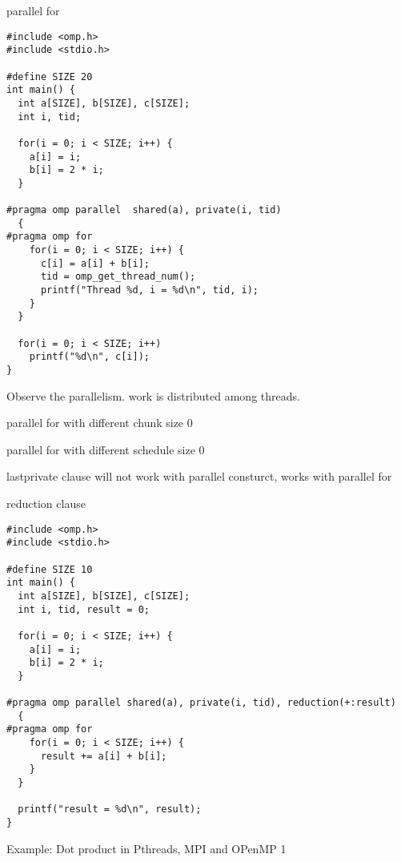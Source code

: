 \documentclass[14pt]{beamer}
\begin{document}
\begin{frame}[fragile]{parallel for}
\begin{Verbatim}
#include <omp.h>
#include <stdio.h>

#define SIZE 20
int main() {        
  int a[SIZE], b[SIZE], c[SIZE];
  int i, tid;

  for(i = 0; i < SIZE; i++) {
    a[i] = i;
    b[i] = 2 * i;
  }

#pragma omp parallel  shared(a), private(i, tid)
  {
#pragma omp for
    for(i = 0; i < SIZE; i++) {
      c[i] = a[i] + b[i];
      tid = omp_get_thread_num();
      printf("Thread %d, i = %d\n", tid, i);
    }
  }

  for(i = 0; i < SIZE; i++)
    printf("%d\n", c[i]);
}
\end{Verbatim}
Observe the parallelism. work is distributed among threads.
\end{frame}

\begin{frame}[fragile]{parallel for with different chunk size}
0
\end{frame}

\begin{frame}[fragile]{parallel for with different schedule size}
0
\end{frame}

\begin{frame}[fragile]{lastprivate clause}
will not work with parallel consturct, works with parallel for
\end{frame}

\begin{frame}[fragile]{reduction clause}
\begin{Verbatim}
#include <omp.h>
#include <stdio.h>

#define SIZE 10
int main() {
  int a[SIZE], b[SIZE], c[SIZE];
  int i, tid, result = 0;

  for(i = 0; i < SIZE; i++) {
    a[i] = i;
    b[i] = 2 * i;
  }

#pragma omp parallel shared(a), private(i, tid), reduction(+:result)
  {
#pragma omp for
    for(i = 0; i < SIZE; i++) {
      result += a[i] + b[i];
    }
  }

  printf("result = %d\n", result);
}
\end{Verbatim}
\end{frame}

\begin{frame}[fragile]{Example: Dot product in Pthreads, MPI and OPenMP}
1
\end{frame}
\end{document}
